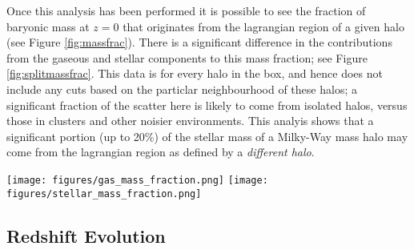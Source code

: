 Once this analysis has been performed it is possible to see the fraction of baryonic mass at $z=0$ that originates from the lagrangian region of a given halo (see Figure \ref{fig:massfrac}). There is a significant difference in the contributions from the gaseous and stellar components to this mass fraction; see Figure \ref{fig:splitmassfrac}. This data is for every halo in the box, and hence does not include any cuts based on the particlar neighbourhood of these halos; a significant fraction of the scatter here is likely to come from isolated halos, versus those in clusters and other noisier environments. This analyis shows that a significant portion (up to 20\%) of the stellar mass of a Milky-Way mass halo may come from the lagrangian region as defined by a \emph{different halo}.


\begin{figure*}
    \centering
    \texttt{[image: figures/gas\_mass\_fraction.png]}
    \texttt{[image: figures/stellar\_mass\_fraction.png]}
    \caption{Left: fraction of gaseous mass at $z=0$ in each halo from each component; right: fraction of stellar mass at $z=0$ from each component. Note that there is significantly more transfer shown in the gaseous component. Gas that is transferred between lagrangian regions must be given time to cool before being able to form stars. As the events that enable transfer are typically very energetic (AGN, stellar feedback, accretion), it is unlikely that the cooling time will be short enough to form stars by the end of the simulation for most transfer.}
    \label{fig:splitmassfrac}
\end{figure*}

\subsection{Redshift Evolution}


